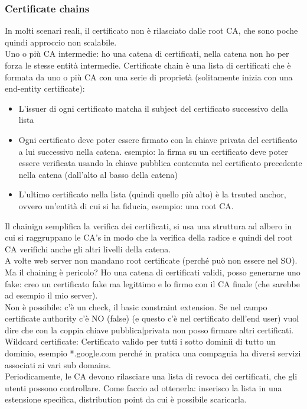 \documentclass[16px]{article}
\begin{document}
\subsubsection{Certificate chains}
In molti scenari reali, il certificato non è rilasciato dalle root CA, che sono poche quindi approccio non scalabile.\\ Uno o più CA intermedie:  ho una catena di certificati, nella catena non ho per forza le stesse entità intermedie. Certificate chain è una lista di certificati che è formata da uno o più CA con una serie di proprietà (solitamente  inizia con una end-entity certificate):
\begin{itemize}
\item L'issuer di ogni certificato matcha il subject del certificato successivo della lista
\item Ogni certificato deve poter essere firmato con la chiave privata del certificato a lui successivo nella catena. esempio: la firma su un certificato deve poter essere verificata usando la chiave pubblica contenuta nel certificato precedente nella catena (dall'alto al basso della catena)
\item L'ultimo certificato nella lista (quindi quello più alto) è la trsuted anchor, ovvero un'entità di cui si ha fiducia, esempio: una root CA.
\end{itemize}
Il chainign semplifica la verifica dei certificati, si usa una struttura ad albero in cui si raggruppano le CA's in modo che la verifica della radice e quindi del root CA verifichi anche gli altri livelli della catena.\\
A volte web server non mandano root certificate (perché può non essere nel SO).\\ Ma il chaining è pericolo? Ho una catena di certificati validi, posso generarne uno fake: creo un certificato fake ma legittimo e lo firmo con il CA finale (che sarebbe ad esempio il mio server).\\ Non è possibile: c'è un check, il basic constraint extension. Se nel campo certificate authority c'è NO (false) (e questo c'è nel certificato dell'end user) vuol dire che con la coppia chiave pubblica$|$privata non posso firmare altri certificati.
\\Wildcard certificate:
Certificato valido per tutti i sotto dominii di tutto un dominio, esempio *.google.com perché in pratica una compagnia ha diversi servizi associati ai vari sub domains.\\ Periodicamente, le CA devono rilasciare una lista di revoca dei certificati, che gli utenti possono controllare. Come faccio ad ottenerla: inserisco la lista in una estensione specifica, distribution point da cui è possibile scaricarla.
\end{document}
